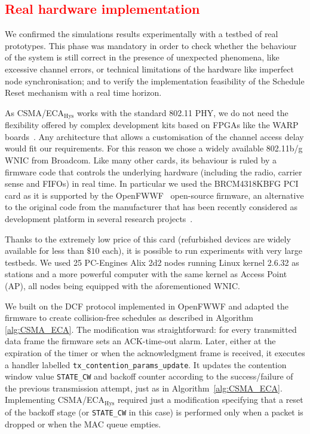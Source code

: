 \textcolor{red}{\section{Real hardware implementation}\label{EDCA}}

We confirmed the simulations results experimentally with a testbed of real prototypes. This phase was mandatory in order to check whether the behaviour of the system is still correct in the presence of unexpected phenomena, like excessive channel errors, or technical limitations of the hardware like imperfect node synchronisation; and to verify the implementation feasibility of the Schedule Reset mechanism with a real time horizon.

As CSMA/ECA$_{\text{Hys}}$ works with the standard 802.11 PHY, we do not need the flexibility offered by complex development kits based on FPGAs like the WARP boards~\cite{amiri2007warp}. Any architecture that allows a customisation of the channel access delay would fit our requirements. For this reason we chose a widely available 802.11b/g WNIC from Broadcom. Like many other cards, its behaviour is ruled by a firmware code that controls the underlying hardware (including the radio, carrier sense and FIFOs) in real time. In particular we used the BRCM4318KBFG PCI card as it is supported by the OpenFWWF~\cite{OpenFWWF} open-source firmware, an alternative to the original code from the manufacturer that has been recently considered as development platform in several research projects~\cite{WMP,gringolitmc14,gringoliccr14,berger14,CF-MAC}. 

Thanks to the extremely low price of this card (refurbished devices are widely available for less than $\$10$ each), it is possible to run experiments with very large testbeds. We used 25 PC-Engines Alix 2d2 nodes running Linux kernel 2.6.32 as stations and a more powerful computer with the same kernel as Access Point (AP), all nodes being equipped with the aforementioned WNIC.

We built on the DCF protocol implemented in OpenFWWF and adapted the firmware to create collision-free schedules as described in Algorithm \ref{alg:CSMA_ECA}. The modification was straightforward: for every transmitted data frame the firmware sets an ACK-time-out alarm. Later, either at the expiration of the timer or when the acknowledgment frame is received, it executes a handler labelled {\tt tx\_contention\_params\_update}. It updates the contention window value {\tt STATE\_CW} and backoff counter according to the success/failure of the previous transmission attempt, just as in Algorithm~\ref{alg:CSMA_ECA}. Implementing CSMA/ECA$_{\text{Hys}}$ required just a modification specifying that a reset of the backoff stage (or {\tt STATE\_CW} in this case) is performed only when a packet is dropped or when the MAC queue empties.

